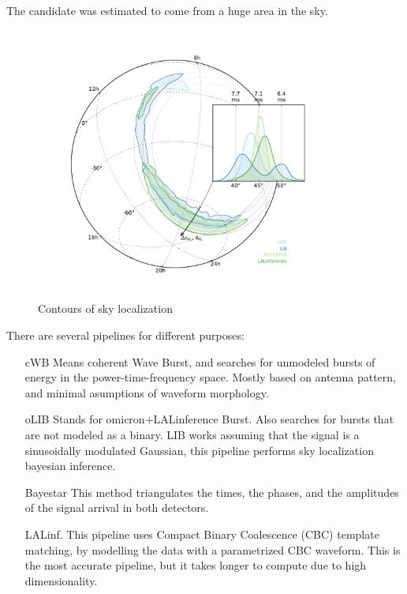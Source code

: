 \documentclass[10pt]{beamer}
\begin{document}
\begin{frame}
The candidate was estimated to come from a huge area in the sky.
\begin{figure}
 \centering
 \includegraphics[width=0.8\textwidth]{./slides/plots/160208492v4/contours.pdf}
 
 \caption{Contours of sky localization}
 \label{fig:contours}
\end{figure}
\end{frame}
\begin{frame}
There are several pipelines for different purposes:

\begin{itemize}[<+->]
 \item[cWB] Means coherent Wave Burst, and searches for unmodeled bursts
 of energy in the power-time-frequency space. Mostly based on antenna pattern, 
 and minimal asumptions of waveform morphology.
 
 \item[oLIB] Stands for omicron+LALinference Burst. Also searches for 
 bursts that are not modeled as a binary. LIB works assuming that the 
 signal is a sinusoidally modulated Gaussian, this pipeline performs 
 sky localization bayesian inference.
 
 \item[Bayestar] This method triangulates the times, the phases, and the 
 amplitudes of the signal arrival in both detectors.
 
 \item[LALinf.] This pipeline uses Compact Binary Coalescence (CBC) 
 template matching, by modelling the data with a parametrized CBC waveform.
 This is the most accurate pipeline, but it takes longer to compute
 due to high dimensionality.
\end{itemize}

\end{frame}
\end{document}
